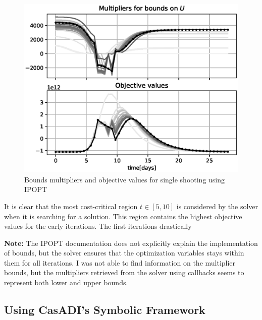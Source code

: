 \begin{figure}[H]
    \centering
    \includegraphics[width=.8\textwidth]{pythonProject/Figures/Single_Shooting_obj_con_IPOPT.eps}
    \caption{Bounds multipliers and objective values for single shooting using IPOPT}
    \label{fig:SH_con_obj_IPOPT}
\end{figure}
It is clear that the most cost-critical region $t\in [5, 10]$ is considered by the solver when it is searching for a solution. This region contains the highest objective values for the early iterations. The first iterations drastically 

\textbf{Note:} The IPOPT documentation does not explicitly explain the implementation of bounds, but the solver ensures that the optimization variables stays within them for all iterations. I was not able to find information on the multiplier bounds, but the multipliers retrieved from the solver using callbacks seems to represent both lower and upper bounds.
\subsection{Using CasADI's Symbolic Framework}
\subsubsection{}